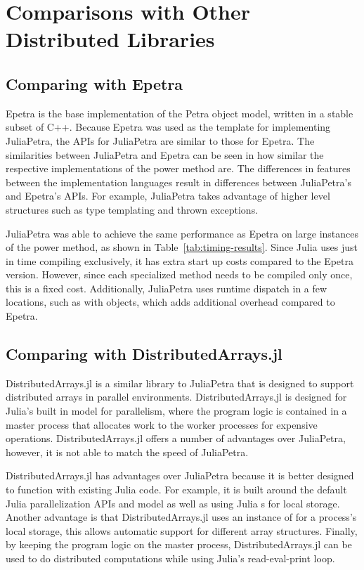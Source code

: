 \documentclass[acmsmall]{acmart}
\newcommand{\juliaSnippet}[1]{\texttt{\detokenize{#1}}}
\begin{document}
\section{Comparisons with Other Distributed Libraries}

\subsection{Comparing with Epetra}

Epetra is the base implementation of the Petra object model,
written in a stable subset of C++. \cite{OverviewOfTrilinos}
Because Epetra was used as the template for implementing JuliaPetra,
the APIs for JuliaPetra are similar to those for Epetra.
The similarities between JuliaPetra and Epetra can be seen in how similar the respective implementations
of the power method are.
The differences in features between the implementation languages result in differences
between JuliaPetra's and Epetra's APIs.
For example, JuliaPetra takes advantage of higher level structures
such as type templating and thrown exceptions.

JuliaPetra was able to achieve the same performance as Epetra on large instances of the power method,
as shown in Table~\ref{tab:timing-results}.
Since Julia uses just in time compiling exclusively, it has extra start up costs compared to
the Epetra version. However, since each specialized method needs to be compiled only once,
this is a fixed cost.
Additionally, JuliaPetra uses runtime dispatch in a few locations, such as with
\juliaSnippet{Comm} objects, which adds additional overhead compared to Epetra.

\subsection{Comparing with DistributedArrays.jl}

DistributedArrays.jl is a similar library to JuliaPetra that is designed to support
distributed arrays in parallel environments. \cite{DAGithub}
DistributedArrays.jl is designed for Julia's built in model for parallelism, where the program logic is
contained in a master process that allocates work to the worker processes for expensive operations.
\cite{JuliaFreshApproach}
DistributedArrays.jl offers a number of advantages over JuliaPetra, however, it is not able to
match the speed of JuliaPetra.

DistributedArrays.jl has advantages over JuliaPetra because it is better designed to function with
existing Julia code.
For example, it is built around the default Julia parallelization APIs and model as well as using
Julia \juliaSnippet{AbstractArray}s for local storage.
Another advantage is that DistributedArrays.jl uses an instance of \juliaSnippet{AbstractArray}
for a process's local storage, this allows automatic support for different array structures.
Finally, by keeping the program logic on the master process, DistributedArrays.jl can be used to
do distributed computations while using Julia's read-eval-print loop.
\end{document}
